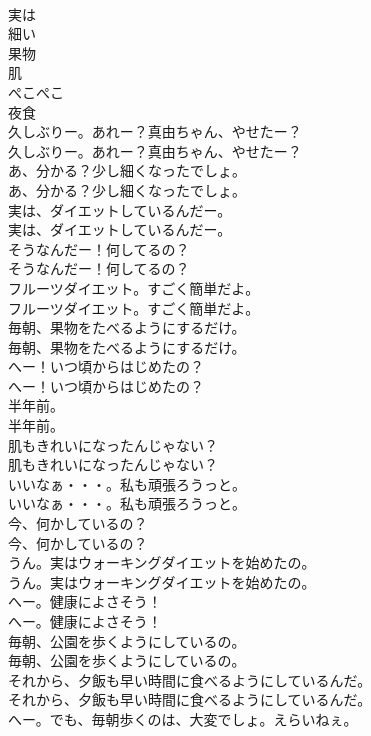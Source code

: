 \documentclass[8pt]{extreport}
\begin{document}
\begin{CJK}{UTF8}{min}
\\	実は
\\	細い
\\	果物
\\	肌
\\	ぺこぺこ
\\	夜食
\\	久しぶりー。あれー？真由ちゃん、やせたー？	
\\	久しぶりー。あれー？真由ちゃん、やせたー？ 
\\	あ、分かる？少し細くなったでしょ。	
\\	あ、分かる？少し細くなったでしょ。 
\\	実は、ダイエットしているんだー。	
\\	実は、ダイエットしているんだー。 
\\	そうなんだー！何してるの？	
\\	そうなんだー！何してるの？ 
\\	フルーツダイエット。すごく簡単だよ。	
\\	フルーツダイエット。すごく簡単だよ。 
\\	毎朝、果物をたべるようにするだけ。	
\\	毎朝、果物をたべるようにするだけ。 
\\	へー！いつ頃からはじめたの？	
\\	へー！いつ頃からはじめたの？ 
\\	半年前。	
\\	半年前。 
\\	肌もきれいになったんじゃない？	
\\	肌もきれいになったんじゃない？ 
\\	いいなぁ・・・。私も頑張ろうっと。	
\\	いいなぁ・・・。私も頑張ろうっと。 
\\	今、何かしているの？	
\\	今、何かしているの？ 
\\	うん。実はウォーキングダイエットを始めたの。	
\\	うん。実はウォーキングダイエットを始めたの。 
\\	へー。健康によさそう！	
\\	へー。健康によさそう！ 
\\	毎朝、公園を歩くようにしているの。	
\\	毎朝、公園を歩くようにしているの。 
\\	それから、夕飯も早い時間に食べるようにしているんだ。	
\\	それから、夕飯も早い時間に食べるようにしているんだ。 
\\	へー。でも、毎朝歩くのは、大変でしょ。えらいねぇ。	

\end{CJK}
\end{document}
